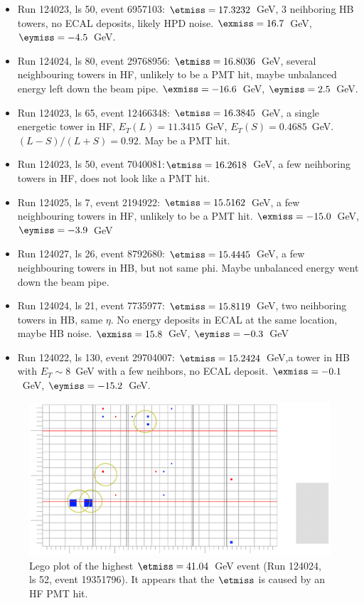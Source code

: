 \begin{itemize}
\item Run 124023, ls 50, event 6957103: $\etmiss=17.3232$~GeV, 3
  neihboring HB towers, no ECAL deposits, likely HPD noise.  $\exmiss=16.7$~GeV, $\eymiss=-4.5$~GeV.

\item Run 124024, ls 80, event 29768956: $\etmiss=16.8036$~GeV, several
  neighbouring towers in HF, unlikely to be a PMT hit, maybe
  unbalanced energy left down the beam pipe. $\exmiss=-16.6$~GeV, $\eymiss=2.5$~GeV.

\item Run 124023, ls 65, event 12466348: $\etmiss=16.3845$~GeV, a single
  energetic tower in HF, $E_{T}(L)= 11.3415$~GeV,
  $E_{T}(S)=0.4685$~GeV. $(L-S)/(L+S)=0.92$. May be a PMT hit.

\item Run 124023, ls 50, event 7040081:$\etmiss=16.2618$~GeV, a few neihboring
towers in HF, does not look like a PMT hit. 

\item Run 124025, ls 7, event 2194922: $\etmiss=15.5162$~GeV, a few neighbouring towers in HF, 
unlikely to be a PMT hit. $\exmiss=-15.0$~GeV, $\eymiss=-3.9$~GeV

\item Run 124027, ls 26, event 8792680: $\etmiss=15.4445$~GeV, a few neighbouring towers in HB,
 but not same phi. Maybe unbalanced energy went down the beam pipe.

\item Run 124024, ls 21,  event 7735977: $\etmiss=15.8119$~GeV, two neihboring towers in HB, same $\eta$. 
  No energy deposits in ECAL at the same location, maybe HB noise. $\exmiss=15.8$~GeV, $\eymiss=-0.3$~GeV

\item Run 124022, ls 130, event 29704007: $\etmiss=15.2424$~GeV,a tower in HB with $E_T\sim 8$~GeV with a few neihbors, no ECAL deposit. $\exmiss=-0.1$~GeV, $\eymiss=-15.2$~GeV.
\end{itemize}


\begin{figure}[h!]
  \includegraphics[width=12cm]{plots_DataVsMC_MB_900GeV/124024_19351796_MET41GeV.eps}
  \caption{Lego plot of the highest $\etmiss=41.04$~GeV event (Run 124024, ls 52, event 19351796). It appears
    that the $\etmiss$ is caused by an HF PMT hit.
    \label{fig:DataVsMC_MB_900_evd1}}
\end{figure}

